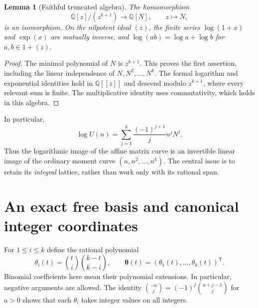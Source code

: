 \documentclass[11pt,letterpaper]{article}
\newtheorem{lemma}[theorem]{Lemma}
\theoremstyle{definition}
\theoremstyle{remark}
\newcommand{\Q}{\mathbb Q}
\newcommand{\vv}{\boldsymbol\theta}
\begin{document}
\begin{lemma}[Faithful truncated algebra]\label{gts:ai:lem:truncated}
The homomorphism
\[
 \Q[z]/(z^{k+1})\longrightarrow \Q[N],\qquad z\longmapsto N,
\]
is an isomorphism. On the nilpotent ideal $(z)$, the finite series $\log(1+x)$ and $\exp(x)$ are mutually inverse, and $\log(ab)=\log a+\log b$ for $a,b\in1+(z)$.
\end{lemma}
\begin{proof}
The minimal polynomial of $N$ is $z^{k+1}$. This proves the first assertion, including the linear independence of $N,N^2,\ldots,N^k$. The formal logarithm and exponential identities hold in $\Q[[z]]$ and descend modulo $z^{k+1}$, where every relevant sum is finite. The multiplicative identity uses commutativity, which holds in this algebra.
\end{proof}
In particular,
\begin{equation}\label{gts:ai:eq:logU}
 \log U(n)=\sum_{j=1}^k\frac{(-1)^{j+1}}j n^jN^j.
\end{equation}
Thus the logarithmic image of the affine matrix curve is an invertible linear image of the ordinary moment curve $(n,n^2,\ldots,n^k)$. The central issue is to retain its \emph{integral} lattice, rather than work only with its rational span.

\section{An exact free basis and canonical integer coordinates}\label{gts:ai:sec:basis}
For $1\le i\le k$ define the rational polynomial
\begin{equation}\label{gts:ai:eq:lambda}
 \theta_i(t)=\binom ti\binom{k-t}{k-i},\qquad
 \vv(t)=(\theta_1(t),\ldots,\theta_k(t))^{\mathsf T}.
\end{equation}
Binomial coefficients here mean their polynomial extensions. In particular, negative arguments are allowed. The identity
$\binom{-a}{j}=(-1)^j\binom{a+j-1}{j}$ for $a>0$ shows that each $\theta_i$ takes integer values on all integers.
\end{document}
